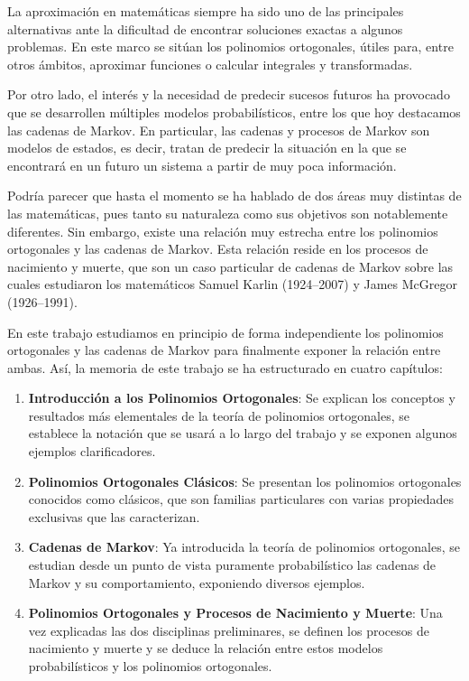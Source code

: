 
La aproximación en matemáticas siempre ha sido uno de las principales alternativas ante la dificultad de encontrar soluciones exactas a algunos problemas. En este marco se sitúan los polinomios ortogonales, útiles para, entre otros ámbitos, aproximar funciones o calcular integrales y transformadas. 

Por otro lado, el interés y la necesidad de predecir sucesos futuros ha provocado que se desarrollen múltiples modelos probabilísticos, entre los que hoy destacamos las cadenas de Markov. En particular, las cadenas y procesos de Markov son modelos de estados, es decir, tratan de predecir la situación en la que se encontrará en un futuro un sistema a partir de muy poca información. 

Podría parecer que hasta el momento se ha hablado de dos áreas muy distintas de las matemáticas, pues tanto su naturaleza como sus objetivos son notablemente diferentes. Sin embargo, existe una relación muy estrecha entre los polinomios ortogonales y las cadenas de Markov. Esta relación reside en los procesos de nacimiento y muerte, que son un caso particular de cadenas de Markov sobre las cuales estudiaron los matemáticos Samuel Karlin (1924--2007) y James McGregor (1926--1991).

En este trabajo estudiamos en principio de forma independiente los polinomios ortogonales y las cadenas de Markov para finalmente exponer la relación entre ambas. Así, la memoria de este trabajo se ha estructurado en cuatro capítulos:

\begin{enumerate}
    \item \textbf{Introducción a los Polinomios Ortogonales}: Se explican los conceptos y resultados más elementales de la teoría de polinomios ortogonales, se establece la notación que se usará a lo largo del trabajo y se exponen algunos ejemplos clarificadores.
    \item \textbf{Polinomios Ortogonales Clásicos}: Se presentan los polinomios ortogonales conocidos como clásicos, que son familias particulares con varias propiedades exclusivas que las caracterizan.
    \item \textbf{Cadenas de Markov}: Ya introducida la teoría de polinomios ortogonales, se estudian desde un punto de vista puramente probabilístico las cadenas de Markov y su comportamiento, exponiendo diversos ejemplos.
    \item \textbf{Polinomios Ortogonales y Procesos de Nacimiento y Muerte}: Una vez explicadas las dos disciplinas preliminares, se definen los procesos de nacimiento y muerte y se deduce la relación entre estos modelos probabilísticos y los polinomios ortogonales.
\end{enumerate}

